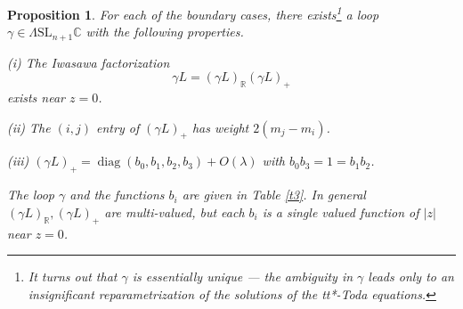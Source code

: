 \documentclass[a4paper,12pt,leqno]{amsart}
\numberwithin{equation}{section}
\theoremstyle{plain}
\newtheorem{proposition}[theorem]{Proposition}
\theoremstyle{definition}
\newcommand{\C}{\mathbb C}
\newcommand{\R}{\mathbb R}
\newcommand{\la}{\lambda}
\newcommand{\La}{\Lambda}
\DeclareMathOperator{\diag}{diag}
\newcommand{\SL}{\textrm{SL}}
\newcommand{\no}{\noindent}
\newcommand{\nn}{m}
\newcommand{\gazi}{\gamma}
\begin{document}
{\begin{proposition}\label{Riwasawa} For each of the boundary cases, there exists\footnote{It turns out that $\gazi$ is essentially unique --- the ambiguity in $\gazi$ leads only to an insignificant reparametrization of the solutions of the tt*-Toda equations.} a loop $\gazi\in\La \SL_{n+1}\C$ with the following properties. 

\no(i) The Iwasawa factorization
\[
\gazi L=(\gazi L)_\R 
(\gazi L)_+
\]
exists near $z=0$.  

\no(ii) The $(i,j)$ entry of $(\gazi L)_+$  has weight $2(\nn_j-\nn_i)$.

\no(iii) $(\gazi L)_+=\diag(b_0,b_1,b_2,b_3)+O(\la)$ with
$b_0b_3=1=b_1b_2$.

\no The loop $\gazi$ and the functions $b_i$ are given 
in Table \ref{t3}.  In general
$(\gazi L)_\R, (\gazi L)_+$
are multi-valued, but each $b_i$ is a
single valued function of $\vert z\vert$ near $z=0$.  
\end{proposition}

}
\end{document}
